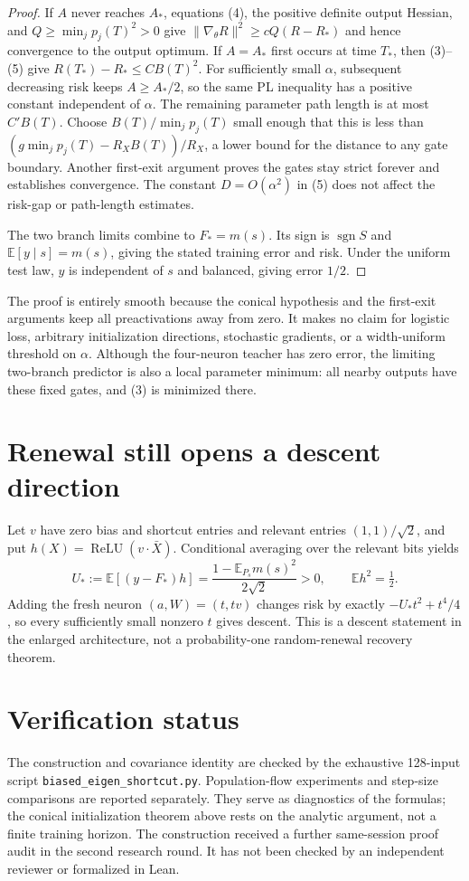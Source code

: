 \documentclass[11pt]{article}
\newcommand{\E}{\mathbb E}\newcommand{\R}{\mathbb R}
\begin{document}
\begin{proof}
If $A$ never reaches $A_*$, equations (4), the positive definite
output Hessian, and $Q\ge\min_jp_j(T)^2>0$ give
$\|\nabla_\theta R\|^2\ge cQ(R-R_*)$ and hence convergence to
the output optimum. If $A=A_*$ first occurs at time $T_*$, then
(3)--(5) give $R(T_*)-R_*\le C B(T)^2$. For sufficiently small
$\alpha$, subsequent decreasing risk keeps $A\ge A_*/2$, so the
same PL inequality has a positive constant independent of $\alpha$.
The remaining parameter path length is at most $C'B(T)$.
Choose $B(T)/\min_jp_j(T)$ small enough that this is less than
$(g\min_jp_j(T)-R_X B(T))/R_X$, a lower bound for the distance to
any gate boundary. Another first-exit argument proves the gates stay
strict forever and establishes convergence. The constant $D=O(\alpha^2)$
in (5) does not affect the risk-gap or path-length estimates.

The two branch limits combine to $F_*=m(s)$. Its sign is
$\operatorname{sgn}S$ and $\E[y\mid s]=m(s)$, giving the stated
training error and risk. Under the uniform test law, $y$ is independent
of $s$ and balanced, giving error $1/2$.
\end{proof}

The proof is entirely smooth because the conical hypothesis and the
first-exit arguments keep all preactivations away from zero. It makes
no claim for logistic loss, arbitrary initialization directions,
stochastic gradients, or a width-uniform threshold on $\alpha$.
Although the four-neuron teacher has zero error, the limiting two-branch
predictor is also a local parameter minimum: all nearby outputs have
these fixed gates, and (3) is minimized there.

\section{Renewal still opens a descent direction}
Let $v$ have zero bias and shortcut entries and relevant entries
$(1,1)/\sqrt2$, and put $h(X)=\operatorname{ReLU}(v\cdot\bar X)$.
Conditional averaging over the relevant bits yields
\[
 U_*:=\E[(y-F_*)h]
      =\frac{1-\E_{P_s}m(s)^2}{2\sqrt2}>0,\qquad \E h^2=\tfrac12.
\]
Adding the fresh neuron $(a,W)=(t,tv)$ changes risk by exactly
$-U_*t^2+t^4/4$, so every sufficiently small nonzero $t$ gives descent.
This is a descent statement in the enlarged architecture, not a
probability-one random-renewal recovery theorem.

\section{Verification status}
The construction and covariance identity are checked by the exhaustive
128-input script \texttt{biased\_eigen\_shortcut.py}. Population-flow
experiments and step-size comparisons are reported separately. They
serve as diagnostics of the formulas; the conical initialization theorem
above rests on the analytic argument, not a finite training horizon.
The construction received a further same-session proof audit in the second
research round. It has not been checked by an independent reviewer or
formalized in Lean.
\end{document}
